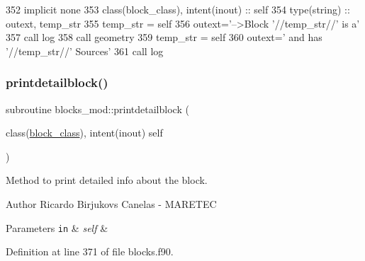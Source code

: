 \begin{DoxyCode}
352     \textcolor{keywordtype}{implicit none}
353     \textcolor{keywordtype}{class}(block\_class), \textcolor{keywordtype}{intent(inout)} :: self
354     \textcolor{keywordtype}{type}(string) :: outext, temp\_str
355     temp\_str = self%
356     outext=\textcolor{stringliteral}{'-->Block '}//temp\_str//\textcolor{stringliteral}{' is a'}
357     \textcolor{keyword}{call }log%
358     \textcolor{keyword}{call }geometry%
359     temp\_str = self%
360     outext=\textcolor{stringliteral}{'      and has '}//temp\_str//\textcolor{stringliteral}{' Sources'}
361     \textcolor{keyword}{call }log%
\end{DoxyCode}
\mbox{\label{namespaceblocks__mod_a10f356706988c45a255922fe70851488}} 
\subsubsection{\texorpdfstring{printdetailblock()}{printdetailblock()}}
{\footnotesize\ttfamily subroutine blocks\+\_\+mod\+::printdetailblock (\begin{DoxyParamCaption}\item[{class(\mbox{\hyperlink{structblocks__mod_1_1block__class}{block\+\_\+class}}), intent(inout)}]{self }\end{DoxyParamCaption})\hspace{0.3cm}{\ttfamily [private]}}



Method to print detailed info about the block. 

\begin{DoxyAuthor}{Author}
Ricardo Birjukovs Canelas -\/ M\+A\+R\+E\+T\+EC 
\end{DoxyAuthor}

\begin{DoxyParams}[1]{Parameters}
\mbox{\tt in}  & {\em self} & \\
\hline
\end{DoxyParams}


Definition at line 371 of file blocks.\+f90.


